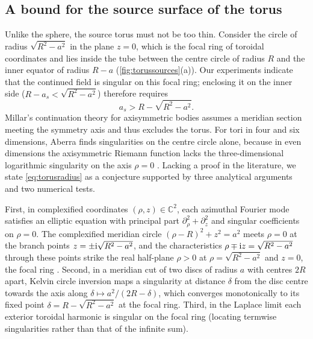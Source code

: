 \subsection{A bound for the source surface of the torus}
\label{sec:torusbound}

Unlike the sphere, the source torus must not be too thin. Consider the circle of radius $\sqrt{R^2-a^2}$ in the plane $z = 0$, which is the focal ring of toroidal coordinates and lies inside the tube between the centre circle of radius $R$ and the inner equator of radius $R-a$ (\autoref{fig:torussources}(a)). Our experiments indicate that the continued field is singular on this focal ring; enclosing it on the inner side ($R - a_s < \sqrt{R^2-a^2}$) therefore requires
\begin{equation}
  a_s > R - \sqrt{R^2-a^2}.
  \label{eq:torusradius}
\end{equation}
Millar's continuation theory for axisymmetric bodies \cite{millar1983} assumes a meridian section meeting the symmetry axis and thus excludes the torus. For tori in four and six dimensions, Aberra \cite{aberra2002} finds singularities on the centre circle alone, because in even dimensions the axisymmetric Riemann function lacks the three-dimensional logarithmic singularity on the axis $\rho = 0$ \cite{millar1983}. Lacking a proof in the literature, we state \eqref{eq:torusradius} as a conjecture supported by three analytical arguments and two numerical tests.

First, in complexified coordinates $(\rho,z)\in\mathbb{C}^2$, each azimuthal Fourier mode satisfies an elliptic equation with principal part $\partial_\rho^2+\partial_z^2$ and singular coefficients on $\rho = 0$. The complexified meridian circle $(\rho-R)^2+z^2 = a^2$ meets $\rho = 0$ at the branch points $z = \pm\mathrm{i}\sqrt{R^2-a^2}$, and the characteristics $\rho\mp\mathrm{i} z = \sqrt{R^2-a^2}$ through these points strike the real half-plane $\rho>0$ at $\rho = \sqrt{R^2-a^2}$ and $z = 0$, the focal ring \cite{millar1983}. Second, in a meridian cut of two discs of radius $a$ with centres $2R$ apart, Kelvin circle inversion maps a singularity at distance $\delta$ from the disc centre towards the axis along $\delta\mapsto a^2/(2R-\delta)$, which converges monotonically to its fixed point $\delta = R - \sqrt{R^2-a^2}$ at the focal ring. Third, in the Laplace limit each exterior toroidal harmonic is singular on the focal ring (locating termwise singularities rather than that of the infinite sum).

